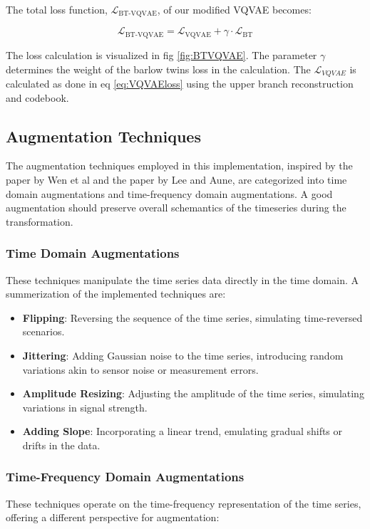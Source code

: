 The total loss function, $\mathcal{L}_{\text{BT-VQVAE}}$, of our modified VQVAE becomes:

\begin{equation}
    \mathcal{L}_{\text{BT-VQVAE}} = \mathcal{L}_{\text{VQVAE}} + \gamma \cdot \mathcal{L}_\text{BT}
    \label{eq:BTVQVAEloss}
\end{equation}

The loss calculation is visualized in fig \ref{fig:BTVQVAE}. The parameter $\gamma$ determines the weight of the barlow twins loss in the calculation. The $\mathcal{L}_{VQVAE}$ is calculated as done in eq \ref{eq:VQVAEloss} using the upper branch reconstruction and codebook.


\subsection{Augmentation Techniques}
The augmentation techniques employed in this implementation, inspired by the paper by Wen et al\cite{augs} and the paper by Lee and Aune\cite{SSLs}, are categorized into time domain augmentations and time-frequency domain augmentations. 
A good augmentation should preserve overall schemantics of the timeseries during the transformation. 

\subsubsection*{Time Domain Augmentations}
These techniques manipulate the time series data directly in the time domain. A summerization of the implemented techniques are:
\begin{itemize}
    \item \textbf{Flipping}: Reversing the sequence of the time series, simulating time-reversed scenarios.
    \item \textbf{Jittering}: Adding Gaussian noise to the time series, introducing random variations akin to sensor noise or measurement errors.
    \item \textbf{Amplitude Resizing}: Adjusting the amplitude of the time series, simulating variations in signal strength.
    \item \textbf{Adding Slope}: Incorporating a linear trend, emulating gradual shifts or drifts in the data.
\end{itemize}

\subsubsection*{Time-Frequency Domain Augmentations}
These techniques operate on the time-frequency representation of the time series, offering a different perspective for augmentation:

